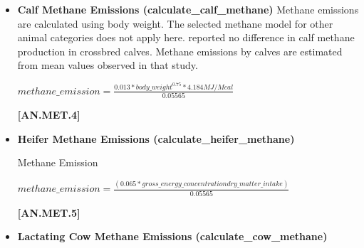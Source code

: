 \documentclass{article}
\begin{document}
\begin{refsection}
\begin{itemize}
    \begin{center}
        \(starch\_to\_acid\_detergent\_fiber\_concentration\_ratio = -0.0011 * \frac{starch\_concentration}{acid\_detergent\_fiber\_concentrations}\)
    \end{center}
        \vspace{0.5cm} 
    
            {\raggedleft \textbf{[AN.MET.3]}\par}
            \vspace{0.5cm}

        \item \textbf{Calf Methane Emissions (calculate\_calf\_methane)}
Methane emissions are calculated using body weight. The selected methane model for other animal categories does not apply here. \cite{Pattanaik2003} reported no difference in calf methane production in crossbred calves. Methane emissions by calves are estimated from mean values observed in that study.
            \vspace{0.5cm}
    
    \begin{center}
        \(methane\_emission = \frac{0.013 * body\_weight^{0.75} * 4.184 MJ/Mcal}{0.05565}\)
    \end{center}
        \vspace{0.5cm} 
    
            {\raggedleft \textbf{[AN.MET.4]}\par}
            \vspace{0.5cm}

        \item \textbf{Heifer Methane Emissions (calculate\_heifer\_methane)}

Methane Emission
            \vspace{0.5cm}
    
    \begin{center}
        \(methane\_emission = \frac{(0.065 * gross\_energy\_concentration dry\_matter\_intake)}{0.05565}\)
    \end{center}
        \vspace{0.5cm} 
    
            {\raggedleft \textbf{[AN.MET.5]}\par}
            \vspace{0.5cm}
            
        \item \textbf{Lactating Cow Methane Emissions (calculate\_cow\_methane)}


\end{itemize}
\end{refsection}
\end{document}
